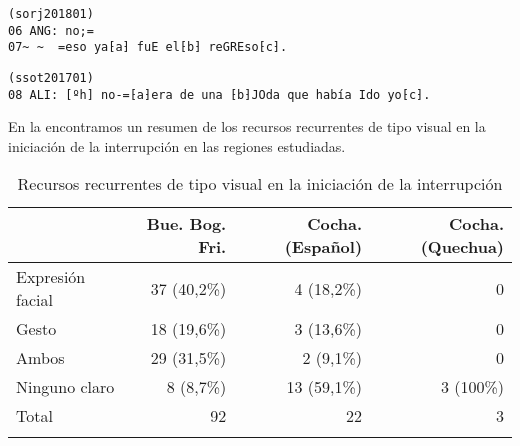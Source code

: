 \documentclass[output=paper]{../langscibook}
\begin{document}
\begin{figure}
%
%
\caption{}
\end{figure}

\clearpage

\ea\label{ex:satti:9}
\begin{verbatim}
(sorj201801)
06 ANG: no;=
07~ ~  =eso ya⁅a⁆ fuE el⁅b⁆ reGREso⁅c⁆.
\end{verbatim}
\z



\begin{figure}
%
%
\caption{}
\end{figure}

\ea\label{ex:satti:10}
\begin{verbatim}
(ssot201701)
08 ALI: [ºh] no-=⁅a⁆era de una ⁅b⁆JOda que había Ido yo⁅c⁆.
\end{verbatim}
\z


\begin{figure}
%
%
\caption{}
\label{fig:satti:202122}
\end{figure}

En la  encontramos un resumen de los recursos recurrentes de tipo visual en la iniciación de la interrupción en las regiones estudiadas.

\begin{table}
\caption{\label{tab:satti:3a}Recursos recurrentes de tipo visual en la iniciación de la interrupción}
\begin{tabularx}{\textwidth}{Xrrr}
\lsptoprule
& Bue. Bog. Fri. & Cocha. (Español) & Cocha. (Quechua)\\
\midrule
Expresión facial & 37 (40,2\%) & 4 (18,2\%) & 0\\
Gesto & 18 (19,6\%) & 3 (13,6\%) & 0\\
Ambos & 29 (31,5\%) & 2 (9,1\%) & 0\\
Ninguno claro & 8 (8,7\%) & 13 (59,1\%) & 3 (100\%)\\
\midrule
Total & 92 & 22 & 3\\
\lspbottomrule
\end{tabularx}
\end{table}
\end{document}
